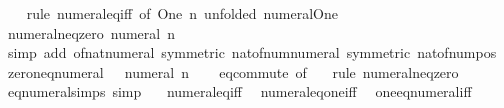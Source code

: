 \begin{isabellebody}
%
\isadelimproof
\ \ %
\endisadelimproof
%
\isatagproof
{}\isamarkupfalse%
\ {\isacharparenleft}{\kern0pt}rule\ numeral{\isacharunderscore}{\kern0pt}eq{\isacharunderscore}{\kern0pt}iff\ {\isacharbrackleft}{\kern0pt}of\ One\ n{\isacharcomma}{\kern0pt}\ unfolded\ numeral{\isacharunderscore}{\kern0pt}One{\isacharbrackright}{\kern0pt}{\isacharparenright}{\kern0pt}%
\endisatagproof
{\isafoldproof}%
%
\isadelimproof
\isanewline
%
\endisadelimproof
\isanewline
{}\isamarkupfalse%
\ numeral{\isacharunderscore}{\kern0pt}neq{\isacharunderscore}{\kern0pt}zero{\isacharcolon}{\kern0pt}\ {\isachardoublequoteopen}numeral\ n\ {\isasymnoteq}\ {}{\isachardoublequoteclose}\isanewline
%
\isadelimproof
\ \ %
\endisadelimproof
%
\isatagproof
{}\isamarkupfalse%
\ {\isacharparenleft}{\kern0pt}simp\ add{\isacharcolon}{\kern0pt}\ of{\isacharunderscore}{\kern0pt}nat{\isacharunderscore}{\kern0pt}numeral\ {\isacharbrackleft}{\kern0pt}symmetric{\isacharbrackright}{\kern0pt}\ nat{\isacharunderscore}{\kern0pt}of{\isacharunderscore}{\kern0pt}num{\isacharunderscore}{\kern0pt}numeral\ {\isacharbrackleft}{\kern0pt}symmetric{\isacharbrackright}{\kern0pt}\ nat{\isacharunderscore}{\kern0pt}of{\isacharunderscore}{\kern0pt}num{\isacharunderscore}{\kern0pt}pos{\isacharparenright}{\kern0pt}%
\endisatagproof
{\isafoldproof}%
%
\isadelimproof
\isanewline
%
\endisadelimproof
\isanewline
{}\isamarkupfalse%
\ zero{\isacharunderscore}{\kern0pt}neq{\isacharunderscore}{\kern0pt}numeral{\isacharcolon}{\kern0pt}\ {\isachardoublequoteopen}{}\ {\isasymnoteq}\ numeral\ n{\isachardoublequoteclose}\isanewline
%
\isadelimproof
\ \ %
\endisadelimproof
%
\isatagproof
{}\isamarkupfalse%
\ eq{\isacharunderscore}{\kern0pt}commute\ {\isacharbrackleft}{\kern0pt}of\ {}{\isacharbrackright}{\kern0pt}\ \isamarkupfalse%
\ {\isacharparenleft}{\kern0pt}rule\ numeral{\isacharunderscore}{\kern0pt}neq{\isacharunderscore}{\kern0pt}zero{\isacharparenright}{\kern0pt}%
\endisatagproof
{\isafoldproof}%
%
\isadelimproof
\isanewline
%
\endisadelimproof
\isanewline
{}\isamarkupfalse%
\ eq{\isacharunderscore}{\kern0pt}numeral{\isacharunderscore}{\kern0pt}simps\ {\isacharbrackleft}{\kern0pt}simp{\isacharbrackright}{\kern0pt}\ {\isacharequal}{\kern0pt}\isanewline
\ \ numeral{\isacharunderscore}{\kern0pt}eq{\isacharunderscore}{\kern0pt}iff\isanewline
\ \ numeral{\isacharunderscore}{\kern0pt}eq{\isacharunderscore}{\kern0pt}one{\isacharunderscore}{\kern0pt}iff\isanewline
\ \ one{\isacharunderscore}{\kern0pt}eq{\isacharunderscore}{\kern0pt}numeral{\isacharunderscore}{\kern0pt}iff\isanewline

\end{isabellebody}
